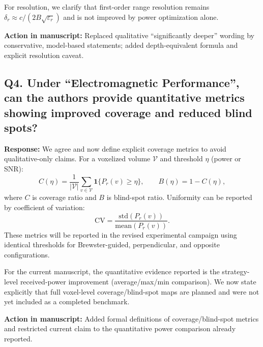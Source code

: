 \documentclass[11pt]{article}
\begin{document}
For resolution, we clarify that first-order range resolution remains $\delta_r\approx c/(2B\sqrt{\varepsilon_r})$ and is not improved by power optimization alone.

\textbf{Action in manuscript:} Replaced qualitative ``significantly deeper'' wording by conservative, model-based statements; added depth-equivalent formula and explicit resolution caveat.

\subsection*{Q4. Under ``Electromagnetic Performance'', can the authors provide quantitative metrics showing improved coverage and reduced blind spots?}
\textbf{Response:} We agree and now define explicit coverage metrics to avoid qualitative-only claims. For a voxelized volume $\mathcal V$ and threshold $\eta$ (power or SNR):
\begin{equation}
C(\eta)=\frac{1}{|\mathcal V|}\sum_{v\in\mathcal V}\mathbf{1}\{P_r(v)\ge\eta\},
\qquad
B(\eta)=1-C(\eta),
\end{equation}
where $C$ is coverage ratio and $B$ is blind-spot ratio. Uniformity can be reported by coefficient of variation:
\begin{equation}
\mathrm{CV}=\frac{\mathrm{std}(P_r(v))}{\mathrm{mean}(P_r(v))}.
\end{equation}
These metrics will be reported in the revised experimental campaign using identical thresholds for Brewster-guided, perpendicular, and opposite configurations.

For the current manuscript, the quantitative evidence reported is the strategy-level received-power improvement (average/max/min comparison). We now state explicitly that full voxel-level coverage/blind-spot maps are planned and were not yet included as a completed benchmark.

\textbf{Action in manuscript:} Added formal definitions of coverage/blind-spot metrics and restricted current claim to the quantitative power comparison already reported.
\end{document}
